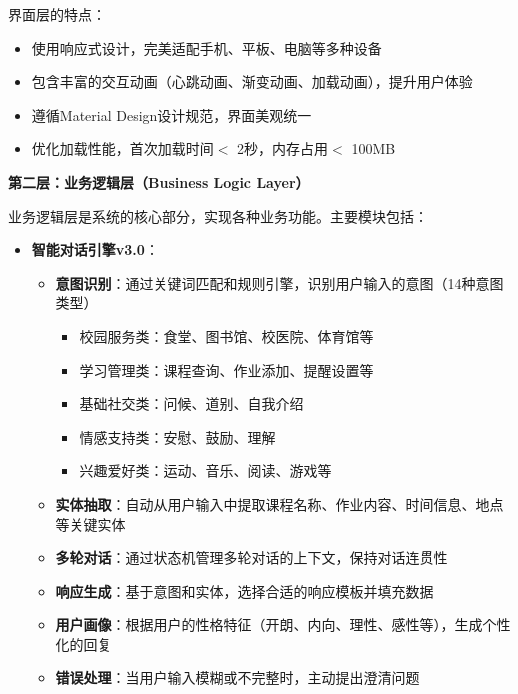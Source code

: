 \documentclass[12pt,a4paper]{article}
\begin{document}
界面层的特点：
\begin{itemize}
    \item 使用响应式设计，完美适配手机、平板、电脑等多种设备
    \item 包含丰富的交互动画（心跳动画、渐变动画、加载动画），提升用户体验
    \item 遵循Material Design设计规范，界面美观统一
    \item 优化加载性能，首次加载时间$<$ 2秒，内存占用$<$ 100MB
\end{itemize}

\textbf{第二层：业务逻辑层（Business Logic Layer）}

业务逻辑层是系统的核心部分，实现各种业务功能。主要模块包括：

\begin{itemize}
    \item \textbf{智能对话引擎v3.0}：
        \begin{itemize}
            \item \textbf{意图识别}：通过关键词匹配和规则引擎，识别用户输入的意图（14种意图类型）
                \begin{itemize}
                    \item 校园服务类：食堂、图书馆、校医院、体育馆等
                    \item 学习管理类：课程查询、作业添加、提醒设置等
                    \item 基础社交类：问候、道别、自我介绍
                    \item 情感支持类：安慰、鼓励、理解
                    \item 兴趣爱好类：运动、音乐、阅读、游戏等
                \end{itemize}
            \item \textbf{实体抽取}：自动从用户输入中提取课程名称、作业内容、时间信息、地点等关键实体
            \item \textbf{多轮对话}：通过状态机管理多轮对话的上下文，保持对话连贯性
            \item \textbf{响应生成}：基于意图和实体，选择合适的响应模板并填充数据
            \item \textbf{用户画像}：根据用户的性格特征（开朗、内向、理性、感性等），生成个性化的回复
            \item \textbf{错误处理}：当用户输入模糊或不完整时，主动提出澄清问题
        \end{itemize}
    

\end{itemize}
\end{document}
